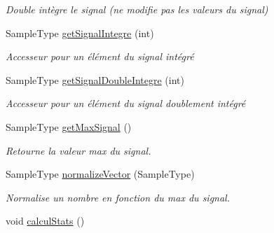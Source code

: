 \begin{DoxyCompactItemize}
\begin{DoxyCompactList}\small\item\em Double intègre le signal (ne modifie pas les valeurs du signal) \end{DoxyCompactList}\item 
Sample\-Type \hyperlink{class_signal_ad40ab4bea98799cf15be88c1d4811152}{get\-Signal\-Integre} (int)
\begin{DoxyCompactList}\small\item\em Accesseur pour un élément du signal intégré \end{DoxyCompactList}\item 
Sample\-Type \hyperlink{class_signal_a70cb3b57f8518dd5a47f683da530769b}{get\-Signal\-Double\-Integre} (int)
\begin{DoxyCompactList}\small\item\em Accesseur pour un élément du signal doublement intégré \end{DoxyCompactList}\item 
Sample\-Type \hyperlink{class_signal_adfd4acc458739bfef0000fd8f0d72fd5}{get\-Max\-Signal} ()
\begin{DoxyCompactList}\small\item\em Retourne la valeur max du signal. \end{DoxyCompactList}\item 
Sample\-Type \hyperlink{class_signal_af84a1d605472c50d699a4ca21b784a98}{normalize\-Vector} (Sample\-Type)
\begin{DoxyCompactList}\small\item\em Normalise un nombre en fonction du max du signal. \end{DoxyCompactList}\item 
\hypertarget{class_signal_ace834afef344f6d8bcfd0d44045fab43}{void \hyperlink{class_signal_ace834afef344f6d8bcfd0d44045fab43}{calcul\-Stats} ()}\label{class_signal_ace834afef344f6d8bcfd0d44045fab43}


\end{DoxyCompactItemize}
